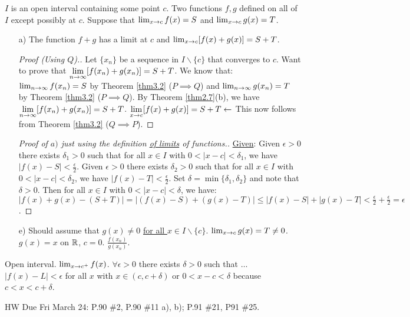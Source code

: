 \documentclass[]{article}
\begin{document}
\begin{theorem}
	$I$ is an open interval containing some point $c$. Two functions $f,g$ defined on all of $I$ except possibly at $c$. Suppose that $\lim_{x\rightarrow c} f(x) = S$ and $\lim_{x\rightarrow c} g(x) = T$.
	\begin{enumerate}
		\item[a)] The function $f+g$ has a limit at $c$ and $\lim_{x\rightarrow c} [ f(x) + g(x) ] = S+T$.
		\begin{proof}
			[Proof (Using $Q$).] Let $\{x_n\}$ be a sequence in $I\backslash\{c\}$ that converges to $c$.
			Want to prove that $\displaystyle\lim_{n\rightarrow\infty} [f(x_n)+g(x_n)] = S+T$.
			We know that: $\lim_{n\rightarrow\infty}f(x_n) = S$ by Theorem \ref{thm3.2} ($P\implies Q$) and $\lim_{n\rightarrow\infty} g(x_n) = T$ by Theorem \ref{thm3.2} ($P\implies Q$).
			By Theorem \ref{thm2.7}(b), we have $\displaystyle\lim_{n\rightarrow\infty} [f(x_n)+g(x_n)] = S+T$.
			$\displaystyle\lim_{x\rightarrow c} [ f(x) + g(x) ] = S+T \leftarrow$ This now follows from Theorem \ref{thm3.2} ($Q\implies P$).
		\end{proof}
		\begin{proof}
			[Proof of $a)$ just using the definition \ul{of limits} of functions.] \ul{Given}: Given $\epsilon>0$ there exists $\delta_1>0$ such that for all $x\in I$ with $0<|x-c|<\delta_1$, we have $|f(x)-S|<\frac{\epsilon}{2}$. Given $\epsilon>0$ there exists $\delta_2>0$ such that for all $x\in I$ with $0<|x-c|<\delta_2$, we have $|f(x)-T|<\frac{\epsilon}{2}$.
			Set $\delta = \min{\{\delta_1,\delta_2\}}$ and note that $\delta>0$. Then for all \ul{$x\in I$} with \ul{$0<|x-c|<\delta$}, we have: $|f(x) +g(x) - (S+T)| = |(f(x)-S) + (g(x)-T)| \leq |f(x)-S| + |g(x)-T| < \frac{\epsilon}{2} + \frac{\epsilon}{2} = \epsilon$.
		\end{proof}
		\item[e)] Should assume that $g(x) \neq 0$ \ul{for all $x\in I\backslash{\{c\}}$}. $\lim_{x\rightarrow c} g(x) = T \neq 0$. $g(x) = x$ on $\mathbb{R}$, $c=0$. $\frac{f(x_n)}{g(x_n)}$.
	\end{enumerate}
\end{theorem}
\begin{definition}
	Open interval. $\lim_{x\rightarrow c^+} f(x)$. $\forall \epsilon>0$ there exists $\delta>0$ such that $\dots$ \ul{$|f(x)-L|<\epsilon$} for all $x$ with $x \in (c,c+\delta)$ or $0<x-c<\delta$ because $c<x<c+\delta$.
\end{definition}
HW Due Fri March 24: P.90 \#2, P.90 \#11 a), b); P.91 \#21, P91 \#25.
\end{document}
